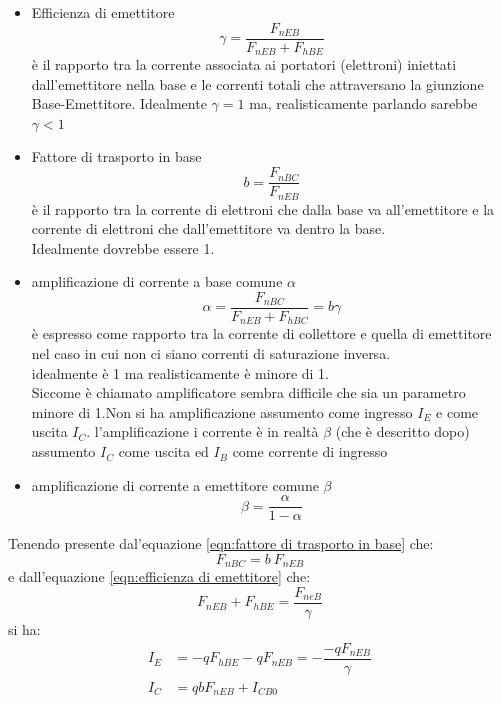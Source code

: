 \begin{itemize}
    \item Efficienza di emettitore  
    \begin{equation}
        \label{eqn:efficienza di emettitore}
        \gamma = \dfrac{F_{nEB}}{F_{nEB}+F_{hBE}}
    \end{equation}
    è il rapporto tra la corrente associata ai portatori (elettroni) iniettati dall'emettitore nella base e le correnti totali che attraversano la giunzione Base-Emettitore. Idealmente $\gamma=1$ ma, realisticamente parlando sarebbe $\gamma < 1$

    \item Fattore di trasporto in base 
    \begin{equation}
        \label{eqn:fattore di trasporto in base}
        b=\dfrac{F_{nBC}}{F_{nEB}}
    \end{equation}
    è il rapporto tra la corrente di elettroni che dalla base va all'emettitore e la corrente di elettroni che dall'emettitore va dentro la base.\\
    Idealmente dovrebbe essere 1.
    \item amplificazione di corrente a base comune $\alpha$
    \begin{equation}
        \label{eqn:amplificazione di corrente a base comune}
     \alpha = \dfrac{F_{nBC}}{F_{nEB}+F_{hBC}} = b \gamma
    \end{equation}
    è espresso come rapporto tra la corrente di collettore e quella di emettitore nel caso in cui non ci siano correnti di saturazione inversa.\\
    idealmente è 1 ma realisticamente è minore di 1.\\

    Siccome è chiamato amplificatore sembra difficile che sia un parametro minore di 1.Non si ha amplificazione assumento come ingresso $I_E$ e come uscita $I_C$. l'amplificazione i corrente è in realtà $\beta$ (che è descritto dopo) assumento $I_C$ come uscita ed $I_B$ come corrente di ingresso
    
    \item amplificazione di corrente a emettitore comune $\beta$
    \begin{equation}
        \label{eqn:amplificazione di corrente a emettitore comune}
        \beta = \dfrac{\alpha}{1-\alpha}
    \end{equation}
\end{itemize}
Tenendo presente dal'equazione \ref{eqn:fattore di trasporto in base} che:
 \begin{equation}
     F_{nBC}=b \ F_{nEB}
 \end{equation}
e dall'equazione \ref{eqn:efficienza di emettitore} che:
\begin{equation}
    F_{nEB}+F_{hBE}=\dfrac{F_{neB}}{\gamma}
\end{equation}
si ha:
\begin{align}
    I_E &= -qF_{hBE}-qF_{nEB}= - \dfrac{-qF_{nEB}}{\gamma}\\
    I_C &= qbF_{nEB}+I_{CB0}
\end{align}

